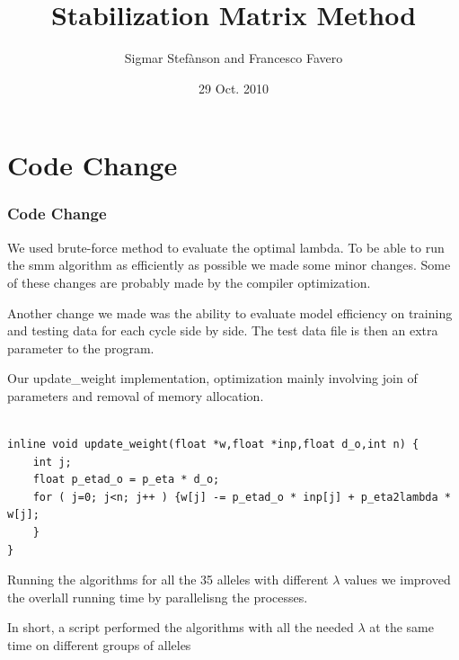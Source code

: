 \documentclass[presentation]{beamer}   %
\begin{document}

\author{Sigmar Stef\`{a}nson and Francesco Favero}
\title{Stabilization Matrix Method}
\date{29 Oct. 2010}



\begin{frame}
  \maketitle
\end{frame}


\section{Code Change}
\begin{frame}
  \frametitle{Code Change}
  \begin{block}\centering
  	We used brute-force method to evaluate the optimal lambda. To be able to run the smm algorithm as efficiently as possible we made some minor changes. Some of these changes are probably made by the compiler optimization.
  \end{block}
   \pause
  \begin{block}\centering
  	Another change we made was the ability to evaluate model efficiency on training and testing data for each cycle side by side. The test data file is then an extra parameter to the program.
  \end{block}
\end{frame}

\begin{frame}
Our update\_weight implementation, optimization mainly involving join of parameters and removal of memory allocation.
 \begin{lstlisting}[basicstyle=\scriptsize,format=C]

inline void update_weight(float *w,float *inp,float d_o,int n) {
	int j;
	float p_etad_o = p_eta * d_o;
	for ( j=0; j<n; j++ ) {w[j] -= p_etad_o * inp[j] + p_eta2lambda * w[j];
	}
}
  \end{lstlisting}
  \pause
  \begin{block}\centering
	Running the algorithms for all the 35 alleles with different $\lambda$ values we improved the overlall running time by parallelisng the processes.
	\par In short, a script performed the algorithms with all the needed $\lambda$ at the same time on different groups of alleles
  \end{block}
\end{frame}
\end{document}
